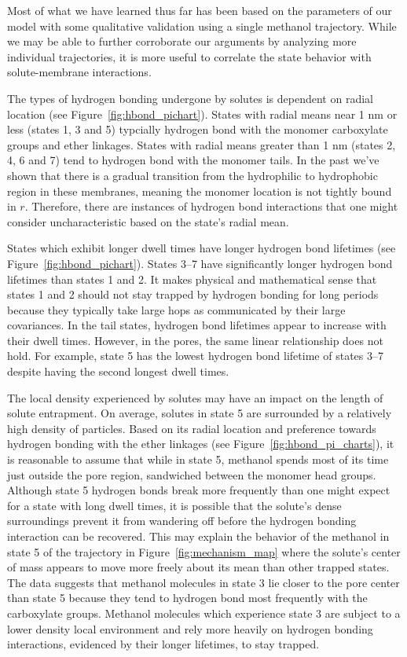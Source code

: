 \documentclass{article}
\begin{document}
  Most of what we have learned thus far has been based on the parameters of our
  model with some qualitative validation using a single methanol trajectory. While 
  we may be able to further corroborate our arguments by analyzing more
  individual trajectories, it is more useful to correlate the state behavior with
  solute-membrane interactions.

  The types of hydrogen bonding undergone by solutes is dependent on radial
  location (see Figure~\ref{fig:hbond_pichart}). States with radial means near 1 nm
  or less (states 1, 3 and 5) typcially hydrogen bond with the monomer carboxylate
  groups and ether linkages. States with radial means greater than 1 nm (states 2,
  4, 6 and 7) tend to hydrogen bond with the monomer tails. In the past we've shown
  that there is a gradual transition from the hydrophilic to hydrophobic region in
  these membranes, meaning the monomer location is not tightly bound in $r$. Therefore,
  there are instances of hydrogen bond interactions that one might consider 
  uncharacteristic based on the state's radial mean.
  
  States which exhibit longer dwell times have longer hydrogen bond lifetimes (see
  Figure~\ref{fig:hbond_pichart}). States 3--7 have significantly longer hydrogen 
  bond lifetimes than states 1 and 2. It makes physical and mathematical sense that
  states 1 and 2 should not stay trapped by hydrogen bonding for long periods because
  they typically take large hops as communicated by their large covariances.
  In the tail states, hydrogen bond lifetimes appear to increase with their dwell 
  times. However, in the pores, the same linear relationship does not hold.
  For example, state 5 has the lowest hydrogen bond lifetime of states 3--7
  despite having the second longest dwell times. 
  
  The local density experienced by solutes may have an impact on the length of solute 
  entrapment. On average, solutes in state 5 are surrounded by a relatively high density
  of particles. Based on its radial location and preference towards hydrogen bonding
  with the ether linkages (see Figure~\ref{fig:hbond_pi_charts}), it is reasonable to
  assume that while in state 5, methanol spends most of its time just outside the 
  pore region, sandwiched between the monomer head groups. Although state 5 hydrogen
  bonds break more frequently than one might expect for a state with long dwell times,
  it is possible that the solute's dense surroundings prevent it from wandering off 
  before the hydrogen bonding interaction can be recovered. This may explain the 
  behavior of the methanol in state 5 of the trajectory in Figure~\ref{fig:mechanism_map}
  where the solute's center of mass appears to move more freely about its mean than 
  other trapped states. The data suggests that methanol molecules in state 3 lie closer
  to the pore center than state 5 because they tend to hydrogen bond most frequently 
  with the carboxylate groups. Methanol molecules which experience state 3 are subject 
  to a lower density local environment and rely more heavily on hydrogen bonding interactions, 
  evidenced by their longer lifetimes, to stay trapped.
  
\end{document}
